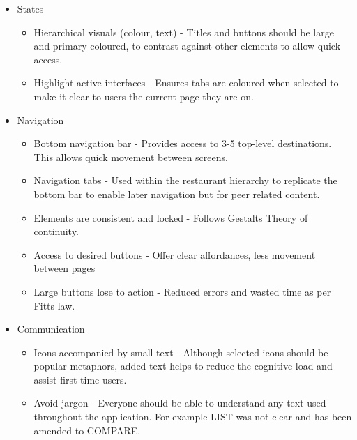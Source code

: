 \documentclass[a4 paper, 12pt]{article}
\begin{document}
\begin{itemize}
            \item States
            \begin{itemize}
                \item Hierarchical visuals (colour, text) - Titles and buttons should be large and primary coloured, to contrast against other elements to allow quick access.
                \item Highlight active interfaces - Ensures tabs are coloured when selected to make it clear to users the current page they are on.
            \end{itemize}

            \item Navigation
            \begin{itemize}                
                \item Bottom navigation bar - Provides access to 3-5 top-level destinations. This allows quick movement between screens.
                \item Navigation tabs - Used within the restaurant hierarchy to replicate the bottom bar to enable later navigation but for peer related content.
                \item Elements are consistent and locked - Follows Gestalts Theory of continuity.
                \item Access to desired buttons - Offer clear affordances, less movement between pages
                \item Large buttons lose to action - Reduced errors and wasted time as per Fitts law.
            \end{itemize}
                
            \item Communication 
            \begin{itemize}
                \item Icons accompanied by small text - Although selected icons should be popular metaphors, added text helps to reduce the cognitive load and assist first-time users.
                \item Avoid jargon - Everyone should be able to understand any text used throughout the application. For example LIST was not clear and has been amended to COMPARE.
            \end{itemize}
            

\end{itemize}
\end{document}
